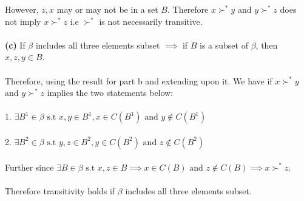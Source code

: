\documentclass[12pt]{article}
\newenvironment{problem}[2][Problem]{\begin{trivlist}
\item[\hskip \labelsep {\bfseries #1}\hskip \labelsep {\bfseries #2.}]}{\end{trivlist}}
\begin{document}
\begin{problem}{6}
However, $ z, x $ may or may not be in a set $B $. Therefore $ x \succ^{*} y $ and $ y \succ^{*} z $ does not imply $ x \succ^{*} z $  i.e  $ \succ^{*} $ is not necessarily transitive. 
\\
\\
\textbf{(c)} If $ \beta $ includes all three elements subset $ \implies $ if $ B $ is a subset of  $ \beta $, then $x, z, y \in B $. 
\\
\\
Therefore, using the result for part b and extending upon it. We have if $ x \succ^{*} y $ and $ y \succ^{*} z $ implies the two statements below: 
\\
\\
1. $\exists B^1 \in \beta  \text{ s.t } x, y \in B^1, x \in C(B^1) \text{ and } y \notin C(B^1)  $
\\
\\
2. $ \exists B^2 \in \beta  \text{ s.t }  y, z \in B^2, y \in C(B^2) \text{ and } z \notin C(B^2)  $
\\
\\
Further since $ \exists B \in \beta  \text{ s.t }  x, z \in B \implies x \in C(B) \text{ and } z \notin C(B)  \implies x \succ^{*} z. $ 
\\
\\
Therefore transitivity holds if $ \beta $ includes all three elements subset.
\end{problem}
\end{document}
